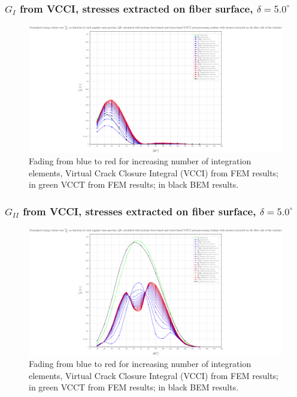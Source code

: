 \begin{frame}
\frametitle{\small $G_{I}$ from VCCI, stresses extracted on fiber surface, $\delta=5.0^{\circ}$}
\vspace{-0.75cm}
\centering
\captionsetup[figure]{font=scriptsize,labelfont=scriptsize}
\begin{figure}[!h]
\centering
\includegraphics[height=0.7\textheight]{2017-07-25_AbqRunSummary_SmallStrain_D05/pdf/2017-07-25_AbqRunSummary_SmallStrain_D05_F-SoF-VCCT_GI.pdf}
  \caption{\scriptsize Fading from blue to red for increasing number of integration elements, Virtual Crack Closure Integral (VCCI) from FEM results; in green VCCT from FEM results; in black BEM results.}
  \label{fig:res1}
\end{figure}
\end{frame}
\begin{frame}
\frametitle{\small $G_{II}$ from VCCI, stresses extracted on fiber surface, $\delta=5.0^{\circ}$}
\vspace{-0.75cm}
\centering
\captionsetup[figure]{font=scriptsize,labelfont=scriptsize}
\begin{figure}[!h]
\centering
\includegraphics[height=0.7\textheight]{2017-07-25_AbqRunSummary_SmallStrain_D05/pdf/2017-07-25_AbqRunSummary_SmallStrain_D05_F-SoF-VCCT_GII.pdf}
  \caption{\scriptsize Fading from blue to red for increasing number of integration elements, Virtual Crack Closure Integral (VCCI) from FEM results; in green VCCT from FEM results; in black BEM results.}
  \label{fig:res1}
\end{figure}
\end{frame}
